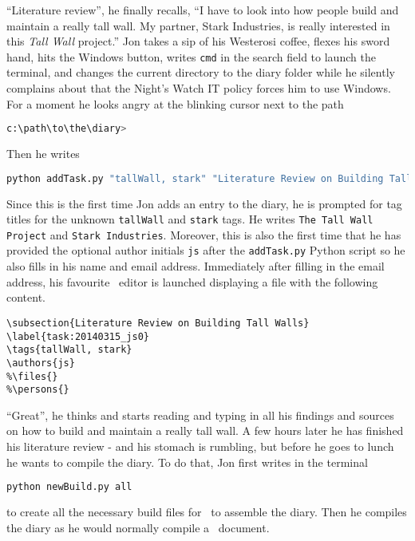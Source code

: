 ``Literature review'', he finally recalls, ``I have to look into how people build and maintain a really tall wall. My partner, Stark Industries, is really interested in this \textit{Tall Wall} project.'' Jon takes a sip of his Westerosi coffee, flexes his sword hand, hits the Windows button, writes {\tt cmd} in the search field to launch the terminal, and changes the current directory to the diary folder while he silently complains about that the Night's Watch IT policy forces him to use Windows. For a moment he looks angry at the blinking cursor next to the path
\begin{lstlisting}[language=bash]
c:\path\to\the\diary>
\end{lstlisting}
Then he writes
\begin{lstlisting}[language=bash]
python addTask.py "tallWall, stark" "Literature Review on Building Tall Walls" js
\end{lstlisting}
Since this is the first time Jon adds an entry to the diary, he is prompted for tag titles for the unknown {\tt tallWall} and {\tt stark} tags. He writes {\tt The Tall Wall Project} and {\tt Stark Industries}. Moreover, this is also the first time that he has provided the optional author initials {\tt js} after the {\tt addTask.py} Python script so he also fills in his name and email address. Immediately after filling in the email address, his favourite \LaTeXe\ editor is launched displaying a file with the following content.
\begin{lstlisting}[language={[LaTeX]TeX}]
% mainfile: ../../../../master.tex
\subsection{Literature Review on Building Tall Walls}
\label{task:20140315_js0}
\tags{tallWall, stark}
\authors{js}
%\files{}
%\persons{}
\end{lstlisting}
``Great'', he thinks and starts reading and typing in all his findings and sources on how to build and maintain a really tall wall. A few hours later he has finished his literature review - and his stomach is rumbling, but before he goes to lunch he wants to compile the diary. To do that, Jon first writes in the terminal 
\begin{lstlisting}[language=bash]
python newBuild.py all
\end{lstlisting}
to create all the necessary build files for \LaTeXe\ to assemble the diary. Then he compiles the diary as he would normally compile a \LaTeXe\ document.

